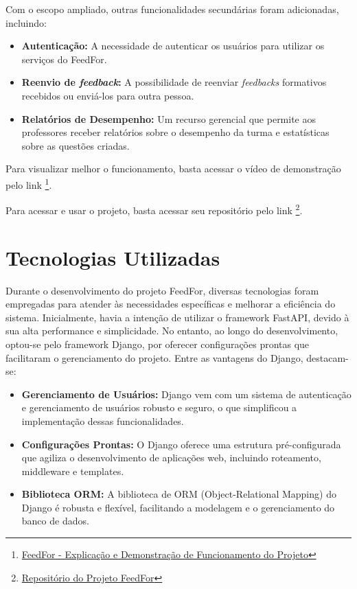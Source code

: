 Com o escopo ampliado, outras funcionalidades secundárias foram adicionadas, incluindo:

\begin{itemize}
    \item \textbf{Autenticação:} A necessidade de autenticar os usuários para utilizar os serviços do FeedFor.
    \item \textbf{Reenvio de \textit{feedback}:} A possibilidade de reenviar \textit{\textit{feedbacks}} formativos recebidos ou enviá-los para outra pessoa.
    \item \textbf{Relatórios de Desempenho:} Um recurso gerencial que permite aos professores receber relatórios sobre o desempenho da turma e estatísticas sobre as questões criadas.
\end{itemize}

Para visualizar melhor o funcionamento, basta acessar o vídeo de demonstração pelo link \footnote{\href{https://youtu.be/KL6FrNapAPk}{FeedFor - Explicação e Demonstração de Funcionamento do Projeto}}.

Para acessar e usar o projeto, basta acessar seu repositório pelo link \footnote{\href{https://github.com/oCaioOliveira/FeedFor}{Repositório do Projeto FeedFor}}.

\section{Tecnologias Utilizadas}

Durante o desenvolvimento do projeto FeedFor, diversas tecnologias foram empregadas para atender às necessidades específicas e melhorar a eficiência do sistema. Inicialmente, havia a intenção de utilizar o framework FastAPI, devido à sua alta performance e simplicidade. No entanto, ao longo do desenvolvimento, optou-se pelo framework Django, por oferecer configurações prontas que facilitaram o gerenciamento do projeto. Entre as vantagens do Django, destacam-se:

\begin{itemize}
    \item \textbf{Gerenciamento de Usuários:} Django vem com um sistema de autenticação e gerenciamento de usuários robusto e seguro, o que simplificou a implementação dessas funcionalidades.
    \item \textbf{Configurações Prontas:} O Django oferece uma estrutura pré-configurada que agiliza o desenvolvimento de aplicações web, incluindo roteamento, middleware e templates.
    \item \textbf{Biblioteca ORM:} A biblioteca de ORM (Object-Relational Mapping) do Django é robusta e flexível, facilitando a modelagem e o gerenciamento do banco de dados.
\end{itemize}


